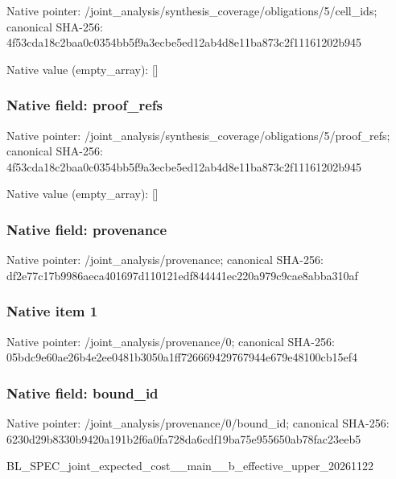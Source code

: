 \documentclass[10pt,a4paper]{article}
\begin{document}
Native pointer: /joint\_analysis/synthesi\allowbreak{}s\_coverage/obligations/5\allowbreak{}/cell\_ids; canonical SHA-256: 4f53cda18c2baa0c0354bb5f\allowbreak{}9a3ecbe5ed12ab4d8e11ba87\allowbreak{}3c2f11161202b945



Native value (empty\_array): []



\subsubsection{Native field: proof\_refs}


Native pointer: /joint\_analysis/synthesi\allowbreak{}s\_coverage/obligations/5\allowbreak{}/proof\_refs; canonical SHA-256: 4f53cda18c2baa0c0354bb5f\allowbreak{}9a3ecbe5ed12ab4d8e11ba87\allowbreak{}3c2f11161202b945



Native value (empty\_array): []



\subsubsection{Native field: provenance}


Native pointer: /joint\_analysis/provenance; canonical SHA-256: df2e77c17b9986aeca401697\allowbreak{}d110121edf844441ec220a97\allowbreak{}9c9cae8abba310af



\subsubsection{Native item 1}


Native pointer: /joint\_analysis/provenance/0; canonical SHA-256: 05bdc9e60ae26b4e2ee0481b\allowbreak{}3050a1ff726669429767944e\allowbreak{}679e48100cb15ef4



\subsubsection{Native field: bound\_id}


Native pointer: /joint\_analysis/provenance/0/bound\_id; canonical SHA-256: 6230d29b8330b9420a191b2f\allowbreak{}6a0fa728da6cdf19ba75e955\allowbreak{}650ab78fac23eeb5


BL\_SPEC\_joint\_expected\_c\allowbreak{}ost\_\_main\_\_b\_effective\_u\allowbreak{}pper\_20261122
\end{document}
